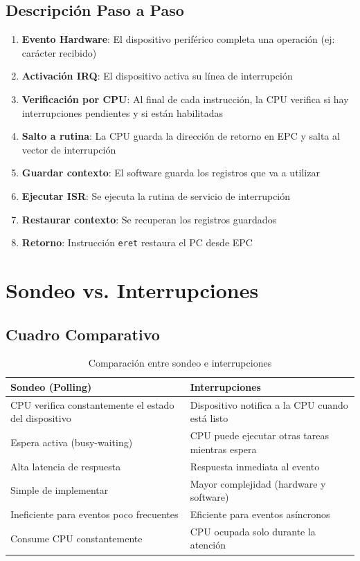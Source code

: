 \documentclass[12pt,a4paper]{article}
\begin{document}
\subsection{Descripción Paso a Paso}
\begin{enumerate}
    \item \textbf{Evento Hardware}: El dispositivo periférico completa una operación (ej: carácter recibido)
    \item \textbf{Activación IRQ}: El dispositivo activa su línea de interrupción
    \item \textbf{Verificación por CPU}: Al final de cada instrucción, la CPU verifica si hay interrupciones pendientes y si están habilitadas
    \item \textbf{Salto a rutina}: La CPU guarda la dirección de retorno en EPC y salta al vector de interrupción
    \item \textbf{Guardar contexto}: El software guarda los registros que va a utilizar
    \item \textbf{Ejecutar ISR}: Se ejecuta la rutina de servicio de interrupción
    \item \textbf{Restaurar contexto}: Se recuperan los registros guardados
    \item \textbf{Retorno}: Instrucción \texttt{eret} restaura el PC desde EPC
\end{enumerate}

\section{Sondeo vs. Interrupciones}

\subsection{Cuadro Comparativo}

\begin{table}[H]
\centering
\begin{tabular}{|p{5cm}|p{5cm}|}
\hline
\textbf{Sondeo (Polling)} & \textbf{Interrupciones} \\
\hline
CPU verifica constantemente el estado del dispositivo & Dispositivo notifica a la CPU cuando está listo \\
\hline
Espera activa (busy-waiting) & CPU puede ejecutar otras tareas mientras espera \\
\hline
Alta latencia de respuesta & Respuesta inmediata al evento \\
\hline
Simple de implementar & Mayor complejidad (hardware y software) \\
\hline
Ineficiente para eventos poco frecuentes & Eficiente para eventos asíncronos \\
\hline
Consume CPU constantemente & CPU ocupada solo durante la atención \\
\hline
\end{tabular}
\caption{Comparación entre sondeo e interrupciones}
\end{table}
\end{document}
